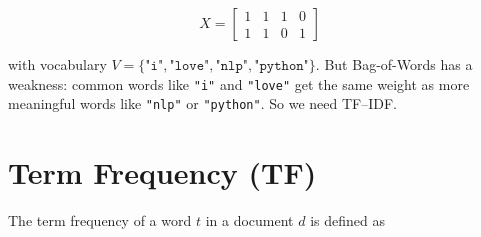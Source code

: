 \[
X =
\begin{bmatrix}
	1 & 1 & 1 & 0 \\
	1 & 1 & 0 & 1
\end{bmatrix}
\]

with vocabulary $V = \{\texttt{"i"}, \texttt{"love"}, \texttt{"nlp"}, \texttt{"python"}\}$. But Bag-of-Words has a weakness: common words like \texttt{"i"} and \texttt{"love"} get the same weight as more meaningful words like \texttt{"nlp"} or \texttt{"python"}.  
So we need TF--IDF.

\section{Term Frequency (TF)}

The term frequency of a word $t$ in a document $d$ is defined as

